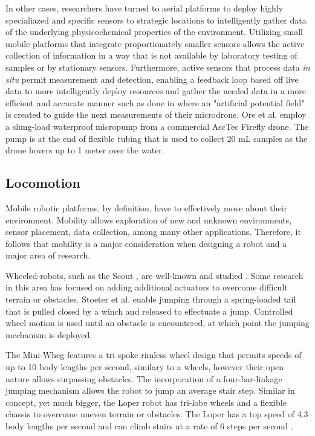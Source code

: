 		In other cases, researchers have turned to aerial platforms to deploy highly specialiazed and specific sensors to strategic locations to intelligently gather data of the underlying physicochemical properties of the environment. Utilizing small mobile platforms that integrate proportionately smaller sensors allows the active collection of information in a way that is not available by laboratory testing of samples or by stationary sensors. Furthermore, active sensors that process data \emph{in situ} permit measurement and detection, enabling a feedback loop based off live data to more intelligently deploy resources and gather the needed data in a more efficient and accurate manner such as done in \cite{Neumann2012} where an "artificial potential field" is created to guide the next measurements of their microdrone. 
		Ore et al. \cite{Ore2015} employ a slung-load waterproof micropump from a commercial AscTec Firefly drone. The pump is at the end of flexible tubing that is used to collect 20 mL samples as the drone hovers up to 1 meter over the water. 

	
	\subsection{Locomotion}%
	\label{sec:locomotion} 

		Mobile robotic platforms, by definition, have to effectively move about their environment. Mobility allows exploration of new and unknown environments, sensor placement, data collection, among many other applications. Therefore, it follows that mobility is a major consideration when designing a robot and a major area of research. 

		Wheeled-robots, such as the Scout \cite{Rybski2000}, are well-known and studied \cite{Soetanto2003}. Some research in this area has focused on adding additional actuators to overcome difficult terrain or obstacles. Stoeter et al. \cite{Stoeter2006} enable jumping through a spring-loaded tail that is pulled closed by a winch and released to effectuate a jump. Controlled wheel motion is used until an obstacle is encountered, at which point the jumping mechanism is deployed. 

		The Mini-Wheg \cite{Morrey2003} features a tri-spoke rimless wheel design that permits speeds of up to 10 body lengths per second, similary to a wheels, however their open nature allows surpassing obstacles. The incorporation of a four-bar-linkage jumping mechanism allows the robot to jump an average stair step. Similar in concept, yet much bigger, the Loper robot \cite{Herbert2008} has tri-lobe wheels and a flexible chassis to overcome uneven terrain or obstacles. The Loper has a top speed of 4.3 body lengths per second and can climb stairs at a rate of 6 steps per second \cite{Herbert2009}.  

